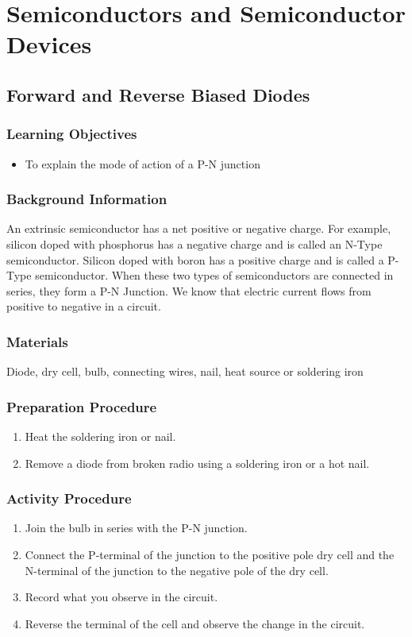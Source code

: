\section{Semiconductors and Semiconductor Devices}

\subsection{Forward and Reverse Biased Diodes}

\subsubsection*{Learning Objectives}
\begin{itemize}
\item{To explain the mode of action of a P-N junction} 
\end{itemize}

\subsubsection*{Background Information}
An extrinsic semiconductor has a net positive or negative charge. For example, silicon doped with phosphorus has a negative charge and is called an N-Type semiconductor. Silicon doped with boron has a positive charge and is called a P-Type semiconductor. When these two types of semiconductors are connected in series, they form a P-N Junction.  
We know that electric current flows from positive to negative in a circuit.  

\subsubsection*{Materials}
Diode, dry cell, bulb, connecting wires, nail, heat source or soldering iron

\subsubsection*{Preparation Procedure}
\begin{enumerate}
\item{Heat the soldering iron or nail.}
\item{Remove a diode from broken radio using a soldering iron or a hot nail.} 
\end{enumerate}

\subsubsection*{Activity Procedure}
\begin{enumerate}
\item{Join the bulb in series with the P-N junction.} 
\item{Connect the P-terminal of the junction to the positive pole dry cell and the N-terminal of the junction to the negative pole of the dry cell.} 
\item{Record what you observe in the circuit.} 
\item{Reverse the terminal of the cell and observe the change in the circuit.} 
\end{enumerate}


